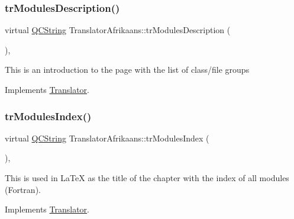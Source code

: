 \mbox{\label{class_translator_afrikaans_a5d359129a419b55babbd2efb8859da0f}} 
\subsubsection{\texorpdfstring{trModulesDescription()}{trModulesDescription()}}
{\footnotesize\ttfamily virtual \mbox{\hyperlink{class_q_c_string}{Q\+C\+String}} Translator\+Afrikaans\+::tr\+Modules\+Description (\begin{DoxyParamCaption}{ }\end{DoxyParamCaption})\hspace{0.3cm}{\ttfamily [inline]}, {\ttfamily [virtual]}}

This is an introduction to the page with the list of class/file groups 

Implements \mbox{\hyperlink{class_translator}{Translator}}.

\mbox{\label{class_translator_afrikaans_a16894a17d36ef86e7fbd16fc2e8f4293}} 
\subsubsection{\texorpdfstring{trModulesIndex()}{trModulesIndex()}}
{\footnotesize\ttfamily virtual \mbox{\hyperlink{class_q_c_string}{Q\+C\+String}} Translator\+Afrikaans\+::tr\+Modules\+Index (\begin{DoxyParamCaption}{ }\end{DoxyParamCaption})\hspace{0.3cm}{\ttfamily [inline]}, {\ttfamily [virtual]}}

This is used in La\+TeX as the title of the chapter with the index of all modules (Fortran). 

Implements \mbox{\hyperlink{class_translator}{Translator}}.

\mbox{\label{class_translator_afrikaans_ae5dce6d855ca656c3f6eff3687555b72}} 
